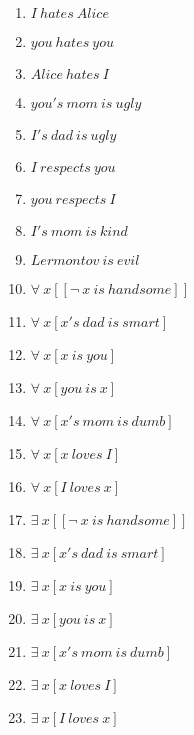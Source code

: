 \documentclass{article}
\begin{document}
\begin{enumerate}
\item $I \ hates \ Alice$

\item $you \ hates \ you$

\item $Alice \ hates \ I$

\item $you's \ mom \ is \ ugly$

\item $I's \ dad \ is \ ugly$

\item $I \ respects \ you$

\item $you \ respects \ I$

\item $I's \ mom \ is \ kind$

\item $Lermontov \ is \ evil$

\item $\forall \ x[[\neg \ x \ is \ handsome]]$

\item $\forall \ x[x's \ dad \ is \ smart]$

\item $\forall \ x[x \ is \ you]$

\item $\forall \ x[you \ is \ x]$

\item $\forall \ x[x's \ mom \ is \ dumb]$

\item $\forall \ x[x \ loves \ I]$

\item $\forall \ x[I \ loves \ x]$

\item $\exists \ x[[\neg \ x \ is \ handsome]]$

\item $\exists \ x[x's \ dad \ is \ smart]$

\item $\exists \ x[x \ is \ you]$

\item $\exists \ x[you \ is \ x]$

\item $\exists \ x[x's \ mom \ is \ dumb]$

\item $\exists \ x[x \ loves \ I]$

\item $\exists \ x[I \ loves \ x]$


\end{enumerate}
\end{document}
